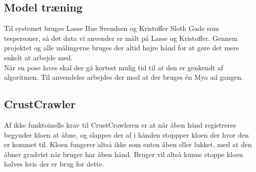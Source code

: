 \subsection*{Model træning}
Til systemet bruges Lasse Bue Svendsen og Kristoffer Sloth Gade som tespersoner, så det data vi anvender er målt på Lasse og Kristoffer. Gennem projektet og alle målingerne bruges der altid højre hånd for at gøre det mere enkelt at arbejde med.\\
Når en pose laves skal der gå kortest mulig tid til at den er genkendt af algoritmen. Til anvendelse arbejdes der mod at der bruges én Myo ad gangen.


\subsection*{CrustCrawler}
Af ikke funktoinelle krav til CrustCrawleren er at når åben hånd registreres begynder kloen at åbne, og slappes der af i hånden stoppper kloen der hvor den er kommet til. Kloen fungerer altså ikke som enten åben eller lukket, med at den åbner gradvist når bruger har åben hånd. Bruger vil altså kunne stoppe kloen halves hvis der er brug for dette.